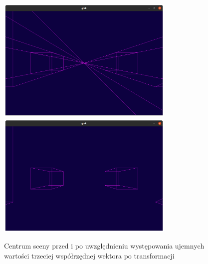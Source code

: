 \documentclass[11pt]{article}
\begin{document}
\begin{figure}
    \caption{Centrum sceny przed i po uwzględnieniu występowania 
    ujemnych wartości trzeciej współrzędnej wektora po transformacji}
    \includegraphics[width=8.5cm]{8.png}
    \includegraphics[width=8.5cm]{9.png}
\end{figure}
\end{document}
